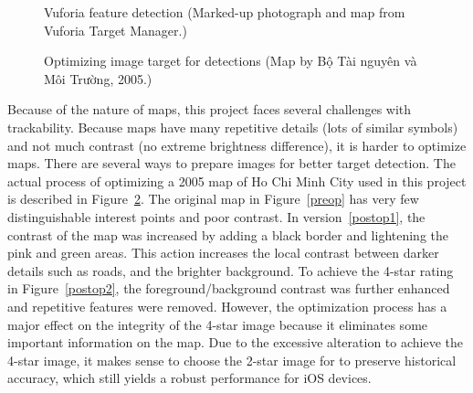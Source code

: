 \begin{figure}[!ht]\centering
{}
\qquad
{}
\vspace{-.2 in}
\caption[Vuforia feature detection]{Vuforia feature detection (Marked-up photograph and map from Vuforia Target Manager.)}\label{feature_ratings}
\end{figure}

\begin{figure}[!ht]\centering
{}
\qquad
{}
\vspace{-.2 in}
\caption[Optimizing image targets]{\vi Optimizing image target for detections (Map by Bộ Tài nguyên và Môi Trường, 2005.\footnotemark)}\label{optimize}
\end{figure}

\vi Because of the nature of maps, this project faces several challenges with trackability. Because maps have many repetitive details (lots of similar symbols) and not much contrast (no extreme brightness difference), it is harder to optimize maps. There are several ways to prepare images for better target detection. The actual process of optimizing a 2005 map of Ho Chi Minh City used in this project is described in Figure~\ref{optimize}. The original map in Figure~\ref{preop} has very few distinguishable interest points and poor contrast. In version~\ref{postop1}, the contrast of the map was  increased by adding a black border and lightening the pink and green areas. This action increases the local contrast between darker details such as roads, and the brighter background. To achieve the 4-star rating in Figure~\ref{postop2}, the foreground/background contrast was further enhanced and repetitive features were removed. However, the optimization process has a major effect on the integrity of the 4-star image because it eliminates some important information on the map. Due to the excessive alteration to achieve the 4-star image, it makes sense to choose the 2-star image for to preserve historical accuracy, which still yields a robust performance for iOS devices. \en

